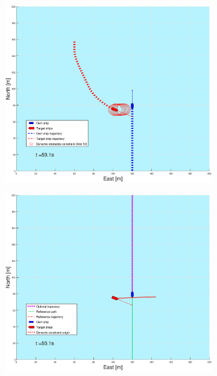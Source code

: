 \begin{figure}[!b]
\begin{subfigure}[b]{0.499\textwidth}
    \end{subfigure}
    \hfill
    \\
    \begin{subfigure}[b]{0.49\textwidth}
        \centering
        \includegraphics[width=\textwidth]{Images/Figures/sving_SO/_Simple_0fig1_time=50}
    \end{subfigure}
    \hfill
    \begin{subfigure}[b]{0.499\textwidth}
        \centering
        \includegraphics[width=\textwidth]{Images/Figures/sving_SO/_Simple_0fig999_time=50}
    \end{subfigure}
    \hfill
\end{figure}%
